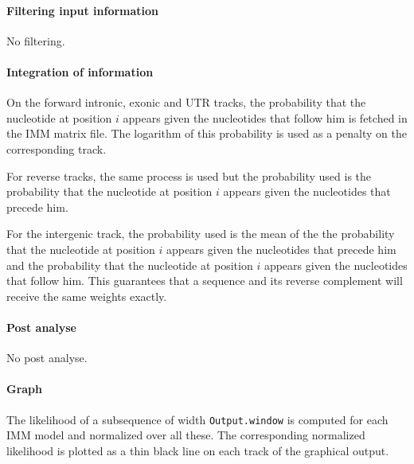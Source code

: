 \paragraph{Filtering input information}

No filtering.

\paragraph{Integration of information}

On the forward intronic, exonic and UTR tracks, the probability that
the nucleotide at position $i$ appears given the nucleotides that
follow him is fetched in the IMM matrix file. The logarithm of this
probability is used as a penalty on the corresponding track.

For reverse tracks, the same process is used but the probability used
is the probability that the nucleotide at position $i$ appears given
the nucleotides that precede him.

For the intergenic track, the probability used is the mean of the the
probability that the nucleotide at position $i$ appears given the
nucleotides that precede him and the probability that the nucleotide
at position $i$ appears given the nucleotides that follow him.  This
guarantees that a sequence and its reverse complement will receive the
same weights exactly.

\paragraph{Post analyse}

No post analyse.

\paragraph{Graph}

The likelihood of a subsequence of width \texttt{Output.window} is
computed for each IMM model and normalized over all these. The
corresponding normalized likelihood is plotted as a thin black line on
each track of the graphical output.


